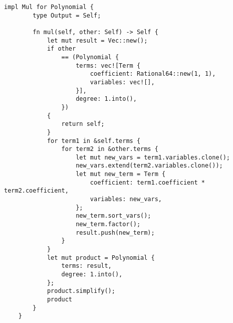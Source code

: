 \begin{lstlisting}[caption={The implementation of the multiplication operation for the \texttt{Polynomial} struct}, label={lst:polynomial-mul}]
    impl Mul for Polynomial {
        type Output = Self;
    
        fn mul(self, other: Self) -> Self {
            let mut result = Vec::new();
            if other
                == (Polynomial {
                    terms: vec![Term {
                        coefficient: Rational64::new(1, 1),
                        variables: vec![],
                    }],
                    degree: 1.into(),
                })
            {
                return self;
            }
            for term1 in &self.terms {
                for term2 in &other.terms {
                    let mut new_vars = term1.variables.clone();
                    new_vars.extend(term2.variables.clone());
                    let mut new_term = Term {
                        coefficient: term1.coefficient * term2.coefficient,
                        variables: new_vars,
                    };
                    new_term.sort_vars();
                    new_term.factor();
                    result.push(new_term);
                }
            }
            let mut product = Polynomial {
                terms: result,
                degree: 1.into(),
            };
            product.simplify();
            product
        }
    }
\end{lstlisting}

